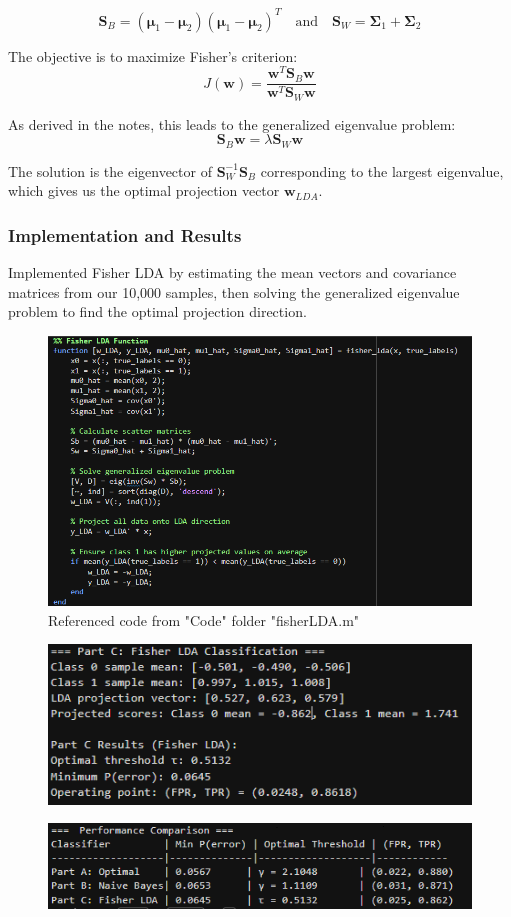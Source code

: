 \documentclass[12pt]{article}
\begin{document}
\[
\mathbf{S}_B = (\boldsymbol{\mu}_1 - \boldsymbol{\mu}_2)(\boldsymbol{\mu}_1 - \boldsymbol{\mu}_2)^T \quad \text{and} \quad \mathbf{S}_W = \boldsymbol{\Sigma}_1 + \boldsymbol{\Sigma}_2
\]

The objective is to maximize Fisher's criterion:
\[
J(\mathbf{w}) = \frac{\mathbf{w}^T \mathbf{S}_B \mathbf{w}}{\mathbf{w}^T \mathbf{S}_W \mathbf{w}}
\]

As derived in the notes, this leads to the generalized eigenvalue problem:
\[
\mathbf{S}_B \mathbf{w} = \lambda \mathbf{S}_W \mathbf{w}
\]

The solution is the eigenvector of $\mathbf{S}_W^{-1} \mathbf{S}_B$ corresponding to the largest eigenvalue, which gives us the optimal projection vector $\mathbf{w}_{LDA}$.

\subsubsection{Implementation and Results}

Implemented Fisher LDA by estimating the mean vectors and covariance matrices from our 10,000 samples, then solving the generalized eigenvalue problem to find the optimal projection direction.

\begin{figure}[H]
    \centering
    \includegraphics[width=0.65\linewidth]{matlab_FisherLDA.png}
    \caption{Referenced code from "Code" folder "fisherLDA.m"}
\end{figure}

\begin{figure}[H]
    \centering
    \includegraphics[width=0.6\linewidth]{resultC.png}
\end{figure}
\begin{figure}[H]
    \centering
    \includegraphics[width=0.6\linewidth]{PartsComparasion.png}
\end{figure}
\end{document}
